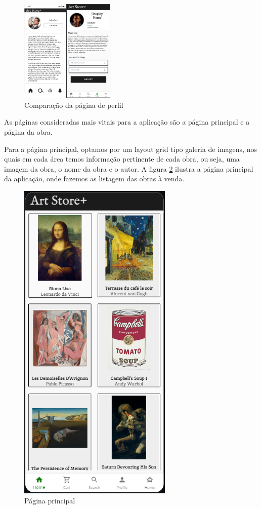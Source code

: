 \documentclass[conference]{IEEEtran}
\begin{document}
\begin{figure}[h]
    \centering
    \includegraphics[width=0.4\textwidth]{profile-early-vs-latest.png}
    \caption{Comparação da página de perfil}
    \label{fig:profilevs}
\end{figure}

As páginas consideradas mais vitais para a aplicação são a página principal e a página da obra.

Para a página principal, optamos por um layout grid tipo galeria de imagens, nos quais em cada 
área temos informação pertinente de cada obra, ou seja, uma imagem da obra, o nome da obra e o autor.
A figura \ref{fig:mainpage} ilustra a página principal da aplicação, onde fazemos as listagem das obras 
à venda.

\begin{figure}[h]
    \centering
    \includegraphics[scale=0.4]{mainpage.png}
    \caption{Página principal}
    \label{fig:mainpage}
\end{figure}
\end{document}
